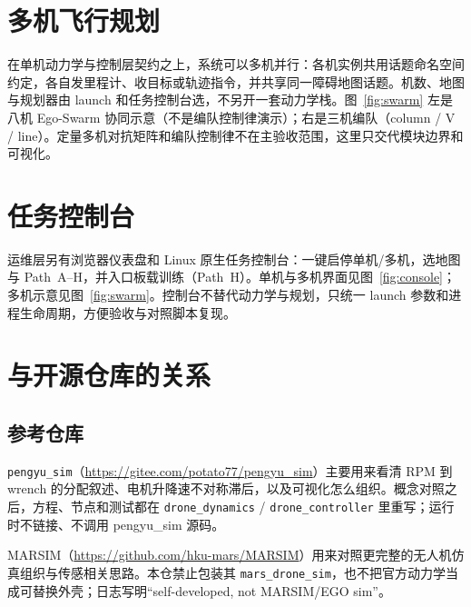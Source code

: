 \label{fig:sac_train}

\chapter{多机飞行规划}

在单机动力学与控制层契约之上，系统可以多机并行：各机实例共用话题命名空间约定，各自发里程计、收目标或轨迹指令，并共享同一障碍地图话题。机数、地图与规划器由 launch 和任务控制台选，不另开一套动力学栈。图~\ref{fig:swarm} 左是八机 Ego-Swarm 协同示意（不是编队控制律演示）；右是三机编队（column / V / line）。定量多机对抗矩阵和编队控制律不在主验收范围，这里只交代模块边界和可视化。


\chapter{任务控制台}

运维层另有浏览器仪表盘和 Linux 原生任务控制台：一键启停单机/多机，选地图与 Path~A--H，并入口板载训练（Path~H）。单机与多机界面见图~\ref{fig:console}；多机示意见图~\ref{fig:swarm}。控制台不替代动力学与规划，只统一 launch 参数和进程生命周期，方便验收与对照脚本复现。


\chapter{与开源仓库的关系}


\section{参考仓库}

\texttt{pengyu\_sim}（\url{https://gitee.com/potato77/pengyu_sim}）主要用来看清 RPM 到 wrench 的分配叙述、电机升降速不对称滞后，以及可视化怎么组织。概念对照之后，方程、节点和测试都在 \texttt{drone\_dynamics} / \texttt{drone\_controller} 里重写；运行时不链接、不调用 pengyu\_sim 源码。

MARSIM（\url{https://github.com/hku-mars/MARSIM}）用来对照更完整的无人机仿真组织与传感相关思路。本仓禁止包装其 \texttt{mars\_drone\_sim}，也不把官方动力学当成可替换外壳；日志写明“self-developed, not MARSIM/EGO sim”。

